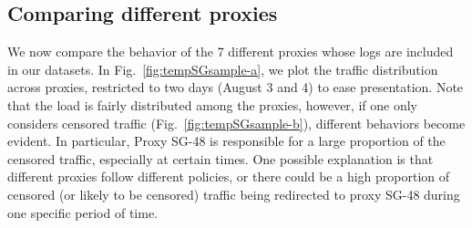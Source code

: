 \documentclass{sig-alternate-2013}
\begin{document}
\begin{table}[t!]
	\centering
{}
\caption{Top censored domains, August 3, 6am-12pm.}
	     \label{tab:top10domains}
\end{table}




\subsection{Comparing different proxies}\label{subsec:inconsistencies}
We now compare the behavior of the 7 different proxies whose logs are included in our datasets. In Fig.~\ref{fig:tempSGsample-a}, we plot the traffic distribution across proxies, restricted to two days (August 3 and 4) to ease presentation. 
Note that the load is fairly distributed among the proxies, however, if one only considers
censored traffic (Fig.~\ref{fig:tempSGsample-b}), different behaviors become evident.
In particular, Proxy SG-48 is responsible for a
large proportion of the censored traffic, especially at certain times. 
One possible explanation is that different proxies follow different policies, or there could be a high proportion of  censored (or likely to be censored) traffic being redirected to proxy  SG-48 during one specific period of time. 
\end{document}

